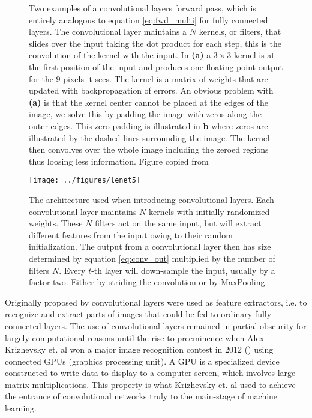 \begin{figure}
\centering
{}
\caption[Convolutional layer illustration]{Two examples of a convolutional layers forward pass, which is entirely analogous to equation \ref{eq:fwd_multi} for fully connected layers. The convolutional layer maintains a $N$ kernels, or filters, that slides over the input taking the dot product for each step, this is the convolution of the kernel with the input. In \textbf{(a)} a $3\times3$ kernel is at the first position of the input and produces one floating point output for the $9$ pixels it sees. The kernel is a matrix of weights that are updated with backpropagation of errors. An obvious problem with \textbf{(a)} is that the kernel center cannot be placed at the edges of the image, we solve this by padding the image with zeros along the outer edges. This zero-padding is illustrated in \textbf{b} where zeros are illustrated by the dashed lines surrounding the image. The kernel then convolves over the whole image including the zeroed regions thus loosing less information. Figure copied from \citet{Dumoulin2016}}\label{fig:conv_aritmetic} 
\end{figure}

\begin{figure}
\centering
\texttt{[image: ../figures/lenet5]}
\caption[Original LeNet architecture]{The architecture \citet{Lecun1998} used when introducing convolutional layers. Each convolutional layer maintains $N$ kernels with initially randomized weights. These $N$ filters act on the same input, but will extract different features from the input owing to their random initialization. The output from a convolutional layer then has size determined by equation \ref{eq:conv_out} multiplied by the number of filters $N$. Every $t$-th layer will down-sample the input, usually by a factor two. Either by striding the convolution or by MaxPooling.}\label{fig:lenet5}
\end{figure}

Originally proposed by \citet{Lecun1998} convolutional layers were used as feature extractors, i.e. to recognize and extract parts of images that could be fed to ordinary fully connected layers. The use of convolutional layers remained in partial obscurity for largely computational reasons until the rise to preeminence when Alex Krizhevsky et. al won a major image recognition contest in 2012 (\cite{Krizhevsky2012}) using connected GPUs (graphics processing unit). A GPU is a specialized device constructed to write data to display to a computer screen, which involves large matrix-multiplications. This property is what Krizhevsky et. al used to achieve the entrance of convolutional networks truly to the main-stage of machine learning. 

